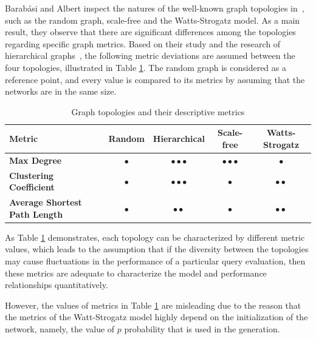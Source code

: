Barabási and Albert inspect the natures of the well-known graph topologies in~\cite{statistical_mechanics}, such as the random graph, scale-free and the Watts-Strogatz model. As a main result, they observe that there are significant differences among the topologies regarding specific graph metrics. Based on their study and the research of hierarchical graphs~\cite{hierarchical}, the following metric deviations are assumed	between the four topologies, illustrated in Table \ref{tab:topology_metrics}. The random graph is considered as a reference point, and every value is compared to its metrics by assuming that the networks are in the same size.
\begin{table}[ht]
	\footnotesize
	\centering
	\begin{tabular}{ l c c c c}
		\toprule
		Metric & Random & Hierarchical & Scale-free & Watts-Strogatz \\ 
		\midrule 
		\textbf{Max Degree} & $\bullet$ & $\bullet \bullet \bullet$ & $\bullet \bullet \bullet$ & $\bullet$ \\ \hline
		\textbf{Clustering Coefficient} & $\bullet$ & $\bullet \bullet \bullet$ & $\bullet$ & $\bullet \bullet $\\ \hline
		\textbf{Average Shortest Path Length} & $\bullet$ & $\bullet \bullet$ & $\bullet$ & $\bullet \bullet$ \\ \hline
		\bottomrule
	\end{tabular}
	\caption{Graph topologies and their descriptive metrics}
	\label{tab:topology_metrics}
\end{table}

As Table \ref{tab:topology_metrics} demonstrates, each topology can be characterized by different metric values, which leads to the assumption that if the diversity between the topologies may cause fluctuations in the performance of a particular query evaluation, then these metrics are adequate to characterize the model and performance relationships quantitatively.


However, the values of metrics in Table \ref{tab:topology_metrics} are misleading due to the reason that the metrics of the Watt-Strogatz model highly depend on the initialization of the network, namely, the value of $p$ probability that is used in the generation.

